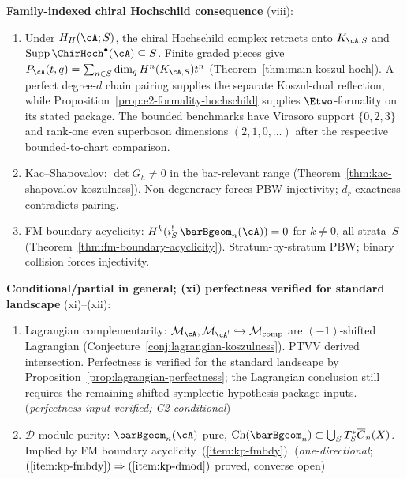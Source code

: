 \medskip\noindent
\textbf{Family-indexed chiral Hochschild consequence} (viii):

\begin{enumerate}[label=\textup{(\roman*)},ref=\roman*,resume]
\item\label{item:kp-hochschild}
 Under $H_H(\cA;S)$, the chiral Hochschild complex retracts onto
 $K_{\cA,S}$ and
 $\operatorname{Supp}\ChirHoch^\bullet(\cA)\subseteq S$.
 Finite graded pieces give
 $P_\cA(t,q)=\sum_{n\in S}\dim_qH^n(K_{\cA,S})t^n$
 \textup{(}Theorem~\ref{thm:main-koszul-hoch}\textup{)}.
 A perfect degree-$d$ chain pairing supplies the separate Koszul-dual
 reflection, while Proposition~\ref{prop:e2-formality-hochschild}
 supplies $\Etwo$-formality on its stated package.  The bounded
 benchmarks have Virasoro support $\{0,2,3\}$ and rank-one even
 superboson dimensions $(2,1,0,\ldots)$ after the respective
 bounded-to-chart comparison.
 \hfill \checkmark
\item\label{item:kp-nullvec}
 Kac--Shapovalov: $\det G_h \neq 0$ in the bar-relevant range
 (Theorem~\ref{thm:kac-shapovalov-koszulness}).
 Non-degeneracy forces PBW injectivity; $d_r$-exactness contradicts pairing.
 \hfill \checkmark
\item\label{item:kp-fmbdy}
 FM boundary acyclicity: $H^k(i_S^!\,\barBgeom_n(\cA)) = 0$ for $k \neq 0$, all strata~$S$
 (Theorem~\ref{thm:fm-boundary-acyclicity}).
 Stratum-by-stratum PBW; binary collision forces injectivity.
 \hfill \checkmark
\end{enumerate}

\medskip\noindent
\textbf{Conditional/partial in general; (xi) perfectness verified for standard landscape} (xi)--(xii):

\begin{enumerate}[label=\textup{(\roman*)},ref=\roman*,resume]
\item\label{item:kp-lagrangian}
 Lagrangian complementarity: $\mathcal{M}_\cA, \mathcal{M}_{\cA^!} \hookrightarrow \mathcal{M}_{\mathrm{comp}}$ are $(-1)$-shifted Lagrangian
 (Conjecture~\ref{conj:lagrangian-koszulness}).
 PTVV derived intersection. Perfectness is verified for the standard
 landscape by Proposition~\ref{prop:lagrangian-perfectness}; the
 Lagrangian conclusion still requires the remaining shifted-symplectic
 hypothesis-package inputs.
 \hfill \checkmark\;(\emph{perfectness input verified; C2 conditional})
\item\label{item:kp-dmod}
 $\mathcal{D}$-module purity: $\barBgeom_n(\cA)$ pure, $\operatorname{Ch}(\barBgeom_n) \subset \bigcup_S T^*_S\overline{C}_n(X)$.
 Implied by FM boundary acyclicity~(\ref{item:kp-fmbdy}).
 \hfill (\emph{one-directional}; $(\ref{item:kp-fmbdy})\Rightarrow(\ref{item:kp-dmod})$ proved, converse open)
\end{enumerate}

